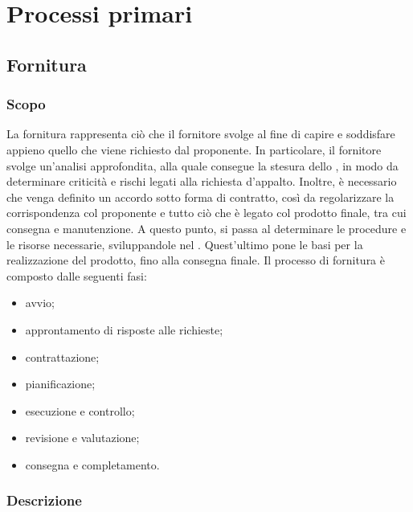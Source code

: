 \section{Processi primari}

\subsection{Fornitura}

\subsubsection{Scopo}

La fornitura rappresenta ciò che il fornitore svolge al fine di capire e soddisfare appieno quello che viene richiesto dal proponente.  In particolare,  il fornitore svolge un'analisi approfondita,  alla quale consegue la stesura dello \SdF{}, in modo da determinare criticità e rischi legati alla richiesta d'appalto. Inoltre, è necessario che venga definito un accordo sotto forma di contratto, così da regolarizzare la corrispondenza col proponente e tutto ciò che è legato col prodotto finale, tra cui consegna e manutenzione. A questo punto, si passa al determinare le procedure e le risorse necessarie,  sviluppandole nel \PdP{}. Quest'ultimo pone le basi per la realizzazione del prodotto, fino alla consegna finale.\newline 
Il processo di fornitura è composto dalle seguenti fasi:
\begin{itemize}

\item avvio;

\item approntamento di risposte alle richieste;

\item contrattazione;

\item pianificazione;

\item esecuzione e controllo;

\item revisione e valutazione;

\item consegna e completamento.

\end{itemize}

\subsubsection{Descrizione}


